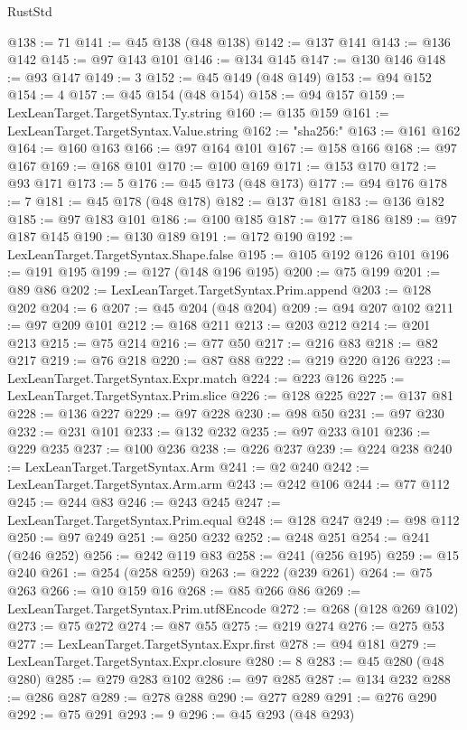 \begin{lexlean}{RustStd}
\begin{coremodule}
@138 := 71
@141 := @45 @138 (@48 @138)
@142 := @137 @141
@143 := @136 @142
@145 := @97 @143 @101
@146 := @134 @145
@147 := @130 @146
@148 := @93 @147
@149 := 3
@152 := @45 @149 (@48 @149)
@153 := @94 @152
@154 := 4
@157 := @45 @154 (@48 @154)
@158 := @94 @157
@159 := LexLeanTarget.TargetSyntax.Ty.string
@160 := @135 @159
@161 := LexLeanTarget.TargetSyntax.Value.string
@162 := "sha256:"
@163 := @161 @162
@164 := @160 @163
@166 := @97 @164 @101
@167 := @158 @166
@168 := @97 @167
@169 := @168 @101
@170 := @100 @169
@171 := @153 @170
@172 := @93 @171
@173 := 5
@176 := @45 @173 (@48 @173)
@177 := @94 @176
@178 := 7
@181 := @45 @178 (@48 @178)
@182 := @137 @181
@183 := @136 @182
@185 := @97 @183 @101
@186 := @100 @185
@187 := @177 @186
@189 := @97 @187 @145
@190 := @130 @189
@191 := @172 @190
@192 := LexLeanTarget.TargetSyntax.Shape.false
@195 := @105 @192 @126 @101
@196 := @191 @195
@199 := @127 (@148 @196 @195)
@200 := @75 @199
@201 := @89 @86
@202 := LexLeanTarget.TargetSyntax.Prim.append
@203 := @128 @202
@204 := 6
@207 := @45 @204 (@48 @204)
@209 := @94 @207 @102
@211 := @97 @209 @101
@212 := @168 @211
@213 := @203 @212
@214 := @201 @213
@215 := @75 @214
@216 := @77 @50
@217 := @216 @83
@218 := @82 @217
@219 := @76 @218
@220 := @87 @88
@222 := @219 @220 @126
@223 := LexLeanTarget.TargetSyntax.Expr.match
@224 := @223 @126
@225 := LexLeanTarget.TargetSyntax.Prim.slice
@226 := @128 @225
@227 := @137 @81
@228 := @136 @227
@229 := @97 @228
@230 := @98 @50
@231 := @97 @230
@232 := @231 @101
@233 := @132 @232
@235 := @97 @233 @101
@236 := @229 @235
@237 := @100 @236
@238 := @226 @237
@239 := @224 @238
@240 := LexLeanTarget.TargetSyntax.Arm
@241 := @2 @240
@242 := LexLeanTarget.TargetSyntax.Arm.arm
@243 := @242 @106
@244 := @77 @112
@245 := @244 @83
@246 := @243 @245
@247 := LexLeanTarget.TargetSyntax.Prim.equal
@248 := @128 @247
@249 := @98 @112
@250 := @97 @249
@251 := @250 @232
@252 := @248 @251
@254 := @241 (@246 @252)
@256 := @242 @119 @83
@258 := @241 (@256 @195)
@259 := @15 @240
@261 := @254 (@258 @259)
@263 := @222 (@239 @261)
@264 := @75 @263
@266 := @10 @159 @16
@268 := @85 @266 @86
@269 := LexLeanTarget.TargetSyntax.Prim.utf8Encode
@272 := @268 (@128 @269 @102)
@273 := @75 @272
@274 := @87 @55
@275 := @219 @274
@276 := @275 @53
@277 := LexLeanTarget.TargetSyntax.Expr.first
@278 := @94 @181
@279 := LexLeanTarget.TargetSyntax.Expr.closure
@280 := 8
@283 := @45 @280 (@48 @280)
@285 := @279 @283 @102
@286 := @97 @285
@287 := @134 @232
@288 := @286 @287
@289 := @278 @288
@290 := @277 @289
@291 := @276 @290
@292 := @75 @291
@293 := 9
@296 := @45 @293 (@48 @293)

\end{coremodule}
\end{lexlean}
